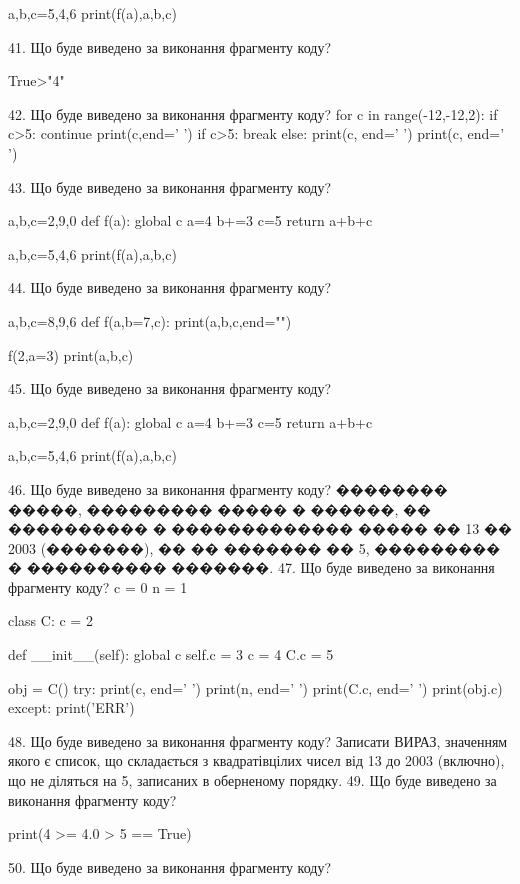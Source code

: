\documentclass[11pt]{article}
\begin{document}
a,b,c=5,4,6
print(f(a),a,b,c)

41. Що буде виведено за виконання фрагменту коду?

True>"4"

42. Що буде виведено за виконання фрагменту коду?
for c in range(-12,-12,2):
    if c>5:
        continue
        print(c,end=' ')
    if c>5:
        break
else:
    print(c, end=' ')
print(c, end=' ')

43. Що буде виведено за виконання фрагменту коду?

a,b,c=2,9,0
def f(a):
global c    a=4
    b+=3
    c=5
    return a+b+c

a,b,c=5,4,6
print(f(a),a,b,c)

44. Що буде виведено за виконання фрагменту коду?

a,b,c=8,9,6
def f(a,b=7,c):
    print(a,b,c,end="")

f(2,a=3)
print(a,b,c)


45. Що буде виведено за виконання фрагменту коду?

a,b,c=2,9,0
def f(a):
global c    a=4
    b+=3
    c=5
    return a+b+c

a,b,c=5,4,6
print(f(a),a,b,c)

46. Що буде виведено за виконання фрагменту коду?
�������� �����, ��������� ����� � ������, �� ���������� � ������������� ����� �� 13 �� 2003 (�������), �� �� ������� �� 5, ��������� � ���������� �������.
47. Що буде виведено за виконання фрагменту коду?
c = 0
n = 1

class C:
    c = 2
    
    def __init__(self):
global c        self.c = 3
        c = 4
        C.c = 5

obj = C()
try:
    print(c, end=' ')
    print(n, end=' ')
    print(C.c, end=' ')
    print(obj.c)
except:
    print('ERR')

48. Що буде виведено за виконання фрагменту коду?
Записати ВИРАЗ, значенням якого є список, що складається з квадратівцілих чисел від 13 до 2003 (включно), що не діляться на 5, записаних в оберненому порядку.
49. Що буде виведено за виконання фрагменту коду?

print(4 >= 4.0 > 5 == True)

50. Що буде виведено за виконання фрагменту коду?
\end{document}
